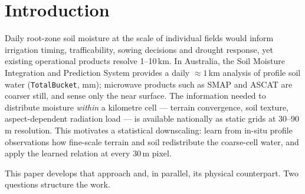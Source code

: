 \documentclass[11pt,a4paper]{article}
\begin{document}
\begin{abstract}
mean-squared error is attributable to bias, and removing each station's mean
offset --- an oracle bound --- raises the median per-station NSE from $+0.13$
to $+0.61$. We further document two methodological defects that materially
inflated interim results, a look-ahead leak in climatology features
(${\approx}0.13$ NSE) and neighbour leakage in station-out validation, and a
data-quality finding that limits the usable record: undocumented per-station
calibration discontinuities restrict the 25-year OzNet archive to a
homogeneous 2002--2013 era. The final process model comprises 14 interpretable
parameters, uses only public national inputs, and produces 30\,m fields for
arbitrary dates. Within the sampled climate envelope it transfers to
unobserved districts at pooled NSE ${\approx}+0.32$; beyond the envelope the
error is confined to the site-level mean, reflecting the limits of the
observation network rather than of either model.

\medskip
\noindent\textbf{Keywords:} soil moisture; downscaling; SMIPS; machine
learning; water balance model; spatial cross-validation; OzNet; Murrumbidgee
\end{abstract}

\section{Introduction}\label{sec:intro}

Daily root-zone soil moisture at the scale of individual fields would inform
irrigation timing, trafficability, sowing decisions and drought response, yet
existing operational products resolve 1--10\,km. In Australia, the Soil
Moisture Integration and Prediction System \citep[SMIPS;][]{smips} provides a
daily ${\approx}1$\,km analysis of profile soil water (\texttt{TotalBucket},
mm); microwave products such as SMAP and ASCAT are coarser still, and sense
only the near surface. The information needed to distribute moisture
\emph{within} a kilometre cell --- terrain convergence, soil texture,
aspect-dependent radiation load --- is available nationally as static grids at
30--90\,m resolution. This motivates a statistical downscaling: learn from
in-situ profile observations how fine-scale terrain and soil redistribute the
coarse-cell water, and apply the learned relation at every 30\,m pixel.

This paper develops that approach and, in parallel, its physical counterpart.
Two questions structure the work.
\end{document}
